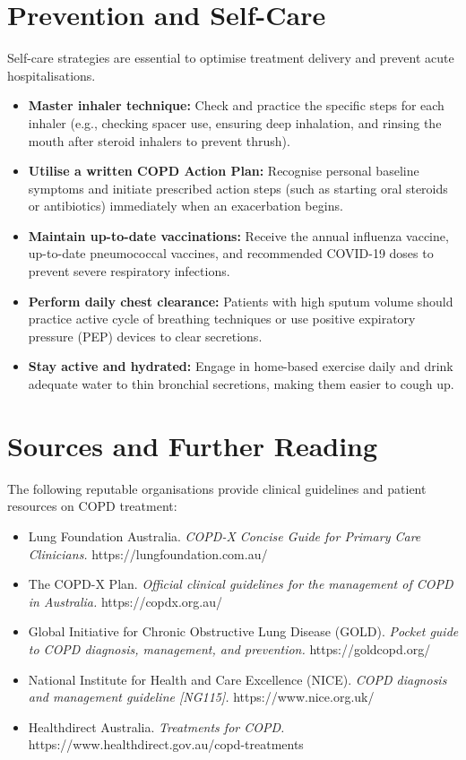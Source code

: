 \section*{Prevention and Self-Care}
Self-care strategies are essential to optimise treatment delivery and prevent acute hospitalisations.
\begin{itemize}
    \item \textbf{Master inhaler technique:} Check and practice the specific steps for each inhaler (e.g., checking spacer use, ensuring deep inhalation, and rinsing the mouth after steroid inhalers to prevent thrush).
    \item \textbf{Utilise a written COPD Action Plan:} Recognise personal baseline symptoms and initiate prescribed action steps (such as starting oral steroids or antibiotics) immediately when an exacerbation begins.
    \item \textbf{Maintain up-to-date vaccinations:} Receive the annual influenza vaccine, up-to-date pneumococcal vaccines, and recommended COVID-19 doses to prevent severe respiratory infections.
    \item \textbf{Perform daily chest clearance:} Patients with high sputum volume should practice active cycle of breathing techniques or use positive expiratory pressure (PEP) devices to clear secretions.
    \item \textbf{Stay active and hydrated:} Engage in home-based exercise daily and drink adequate water to thin bronchial secretions, making them easier to cough up.
\end{itemize}

\section*{Sources and Further Reading}
The following reputable organisations provide clinical guidelines and patient resources on COPD treatment:
\begin{itemize}
    \item Lung Foundation Australia. \textit{COPD-X Concise Guide for Primary Care Clinicians.} https://lungfoundation.com.au/
    \item The COPD-X Plan. \textit{Official clinical guidelines for the management of COPD in Australia.} https://copdx.org.au/
    \item Global Initiative for Chronic Obstructive Lung Disease (GOLD). \textit{Pocket guide to COPD diagnosis, management, and prevention.} https://goldcopd.org/
    \item National Institute for Health and Care Excellence (NICE). \textit{COPD diagnosis and management guideline [NG115].} https://www.nice.org.uk/
    \item Healthdirect Australia. \textit{Treatments for COPD.} https://www.healthdirect.gov.au/copd-treatments
\end{itemize}
